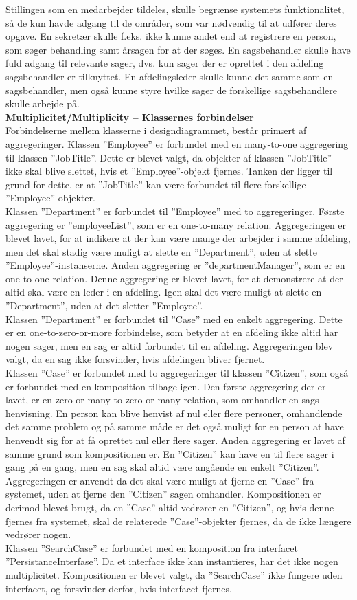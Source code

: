 Stillingen som en medarbejder tildeles, skulle begrænse systemets funktionalitet, så de kun havde adgang til de områder, som var nødvendig til at udfører deres opgave. En sekretær skulle f.eks. ikke kunne andet end at registrere en person, som søger behandling samt årsagen for at der søges. En sagsbehandler skulle have fuld adgang til relevante sager, dvs. kun sager der er oprettet i den afdeling sagsbehandler er tilknyttet. En afdelingsleder skulle kunne det samme som en sagsbehandler, men også kunne styre hvilke sager de forskellige sagsbehandlere skulle arbejde på.\\
\textbf{Multiplicitet/Multiplicity – Klassernes forbindelser}\\
Forbindelserne mellem klasserne i designdiagrammet, består primært af aggregeringer. Klassen ”Employee” er forbundet med en many-to-one aggregering til klassen ”JobTitle”. Dette er blevet valgt, da objekter af klassen ”JobTitle” ikke skal blive slettet, hvis et ”Employee”-objekt fjernes. Tanken der ligger til grund for dette, er at ”JobTitle” kan være forbundet til flere forskellige ”Employee”-objekter. \\
Klassen ”Department” er forbundet til ”Employee” med to aggregeringer. Første aggregering er ”employeeList”, som er en one-to-many relation. Aggregeringen er blevet lavet, for at indikere at der kan være mange der arbejder i samme afdeling, men det skal stadig være muligt at slette en ”Department”, uden at slette ”Employee”-instanserne. Anden aggregering er ”departmentManager”, som er en one-to-one relation. Denne aggregering er blevet lavet, for at demonstrere at der altid skal være en leder i en afdeling. Igen skal det være muligt at slette en ”Department”, uden at det sletter ”Employee”.\\
Klassen ”Department” er forbundet til ”Case” med en enkelt aggregering. Dette er en one-to-zero-or-more forbindelse, som betyder at en afdeling ikke altid har nogen sager, men en sag er altid forbundet til en afdeling. Aggregeringen blev valgt, da en sag ikke forsvinder, hvis afdelingen bliver fjernet. \\
Klassen ”Case” er forbundet med to aggregeringer til klassen ”Citizen”, som også er forbundet med en komposition tilbage igen. Den første aggregering der er lavet, er en zero-or-many-to-zero-or-many relation, som omhandler en sags henvisning. En person kan blive henvist af nul eller flere personer, omhandlende det samme problem og på samme måde er det også muligt for en person at have henvendt sig for at få oprettet nul eller flere sager. Anden aggregering er lavet af samme grund som kompositionen er. En ”Citizen” kan have en til flere sager i gang på en gang, men en sag skal altid være angående en enkelt ”Citizen”. Aggregeringen er anvendt da det skal være muligt at fjerne en ”Case” fra systemet, uden at fjerne den ”Citizen” sagen omhandler. Kompositionen er derimod blevet brugt, da en ”Case” altid vedrører en ”Citizen”, og hvis denne fjernes fra systemet, skal de relaterede ”Case”-objekter fjernes, da de ikke længere vedrører nogen.\\
Klassen ”SearchCase” er forbundet med en komposition fra interfacet ”PersistanceInterfase”. Da et interface ikke kan instantieres, har det ikke nogen multiplicitet. Kompositionen er blevet valgt, da ”SearchCase” ikke fungere uden interfacet, og forsvinder derfor, hvis interfacet fjernes.\\

